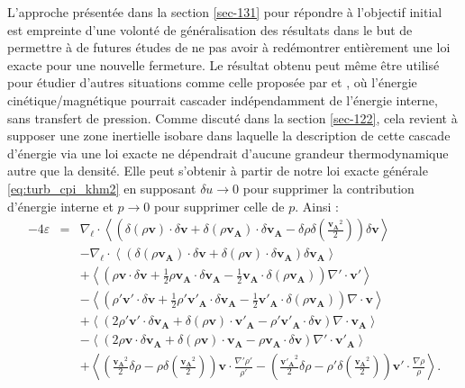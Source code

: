 L'approche présentée dans la section \ref{sec-131} pour répondre à l'objectif initial est empreinte d'une volonté de généralisation des résultats dans le but de permettre à de futures études de ne pas avoir à redémontrer entièrement une loi exacte pour une nouvelle fermeture. Le résultat obtenu peut même être utilisé pour étudier d'autres situations comme celle proposée par  \cite{aluie_conservative_2012} et \cite{hellinger_spectral_2021}, où l'énergie cinétique/magnétique pourrait cascader indépendamment de l'énergie interne, sans transfert de pression. Comme discuté dans la section \ref{sec-122}, cela revient à supposer une zone inertielle isobare dans laquelle la description de cette cascade d'énergie via une loi exacte ne dépendrait d'aucune grandeur thermodynamique autre que la densité. Elle peut s'obtenir à partir de notre loi exacte générale \eqref{eq:turb_cpi_khm2} en supposant $\delta u \rightarrow 0$ pour supprimer la contribution d'énergie interne et $p \rightarrow 0$ pour supprimer celle de $p$. Ainsi : 
\begin{eqnarray}
\label{eq:turb_elisop_f2}-4\varepsilon &=& \nabla_{\boldsymbol{\ell}} \cdot \left<\left(\delta \left(\rho\boldsymbol{v}\right) \cdot \delta \boldsymbol{v}+ \delta \left(\rho\boldsymbol{v_A}\right) \cdot \delta \boldsymbol{v_A} - \delta \rho  \delta \left(\frac{\boldsymbol{v_A}^2}{2}\right)\right) \delta \boldsymbol{v}  \right> \\
&&-\nabla_{\boldsymbol{\ell}} \cdot \left< \left(\delta \left(\rho\boldsymbol{v_A}\right) \cdot \delta \boldsymbol{v}  + \delta \left(\rho\boldsymbol{v}\right) \cdot \delta \boldsymbol{v_A}  \right) \delta \boldsymbol{v_A} \right> \nonumber\\
&& +\left< \left(\rho \boldsymbol{v} \cdot \delta \boldsymbol{v} +\frac{1}{2} \rho \boldsymbol{v_A} \cdot \delta \boldsymbol{v_A} -\frac{1}{2} \boldsymbol{v_A} \cdot \delta \left(\rho \boldsymbol{v_A}\right) \right) \nabla' \cdot \boldsymbol{v'} \right>\nonumber\\
&& -\left< \left(\rho' \boldsymbol{v'} \cdot \delta \boldsymbol{v} +\frac{1}{2} \rho' \boldsymbol{v'_A} \cdot \delta \boldsymbol{v_A} -\frac{1}{2} \boldsymbol{v'_A} \cdot \delta \left(\rho \boldsymbol{v_A}\right)  \right)\nabla \cdot \boldsymbol{v}\right>\nonumber\\
&&+ \left<\left(2 \rho' \boldsymbol{v'} \cdot \delta \boldsymbol{v_A}+ \delta\left(\rho \boldsymbol{v}\right) \cdot \boldsymbol{v'_A} - \rho' \boldsymbol{v'_A} \cdot \delta \boldsymbol{v}  \right)\nabla \cdot \boldsymbol{v_A}\right>\nonumber\\
&&- \left<\left(2\rho \boldsymbol{v} \cdot \delta \boldsymbol{v_A} + \delta\left(\rho \boldsymbol{v}\right) \cdot \boldsymbol{v_A} - \rho \boldsymbol{v_A} \cdot \delta \boldsymbol{v}  \right)\nabla' \cdot \boldsymbol{v'_A}\right>\nonumber \\
&&+  \left< \left(\frac{\boldsymbol{v_A}^2}{2} \delta \rho - \rho \delta \left(\frac{\boldsymbol{v_A}^2}{2}\right)  \right)\boldsymbol{v} \cdot \frac{\nabla' \rho'}{\rho'}- \left(\frac{\boldsymbol{v'_A}^2}{2} \delta \rho - \rho' \delta \left(\frac{\boldsymbol{v_A}^2}{2} \right)  \right)  \boldsymbol{v'} \cdot \frac{\nabla \rho}{\rho} \right> .\nonumber
\end{eqnarray} 
